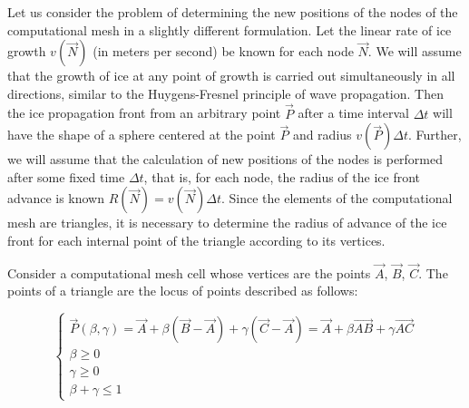 \documentclass[
11pt,%
tightenlines,%
twoside,%
onecolumn,%
nofloats,%
nobibnotes,%
nofootinbib,%
superscriptaddress,%
noshowpacs,%
centertags]%
{revtex4}
\begin{document}
Let us consider the problem of determining the new positions of the nodes of the computational mesh in a slightly different formulation.
Let the linear rate of ice growth $v(\vec{N})$ (in meters per second) be known for each node $\vec{N}$.
We will assume that the growth of ice at any point of growth is carried out simultaneously in all directions, similar to the Huygens-Fresnel principle of wave propagation.
Then the ice propagation front from an arbitrary point $\vec{P}$ after a time interval $\Delta t$ will have the shape of a sphere centered at the point $\vec{P}$ and radius $v(\vec{P}) \Delta t$.
Further, we will assume that the calculation of new positions of the nodes is performed after some fixed time $\Delta t$, that is, for each node, the radius of the ice front advance is known $R(\vec{N}) = v(\vec{N}) \Delta t$.
Since the elements of the computational mesh are triangles, it is necessary to determine the radius of advance of the ice front for each internal point of the triangle according to its vertices.

Consider a computational mesh cell whose vertices are the points $\vec{A}$, $\vec{B}$, $\vec{C}$.
The points of a triangle are the locus of points described as follows:

\begin{equation}
\begin{cases}
\vec{P}(\beta, \gamma) = \vec{A} + \beta (\vec{B} - \vec{A}) + \gamma (\vec{C} - \vec{A}) = \vec{A} + \beta \vec{AB} + \gamma \vec{AC} \\
\beta \ge 0 \\
\gamma \ge 0 \\
\beta + \gamma \le 1
\end{cases}
\end{equation}
\end{document}
